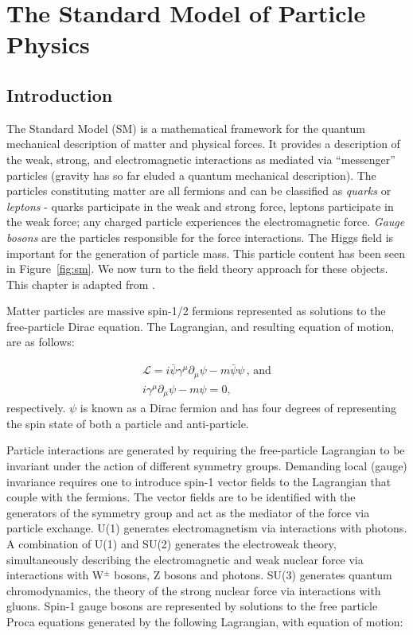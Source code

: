 \chapter{The Standard Model of Particle Physics}
\label{chap:sm}

\section{Introduction}

The Standard Model (SM) is a mathematical framework for the quantum mechanical description of matter and physical forces. It provides a description of the weak, strong, and electromagnetic interactions as mediated via ``messenger'' particles (gravity has so far eluded a quantum mechanical description). The particles constituting matter are all fermions and can be classified as \textit{quarks} or \textit{leptons} - quarks participate in the weak and strong force, leptons participate in the weak force; any charged particle experiences the electromagnetic force. \textit{Gauge bosons} are the particles responsible for the force interactions. The Higgs field is important for the generation of particle mass. This particle content has been seen in Figure~\ref{fig:sm}. We now turn to the field theory approach for these objects. This chapter is adapted from \cite{halzmar, thomson, griffiths}.

Matter particles are massive spin-1/2 fermions represented as solutions to the free-particle Dirac equation. The Lagrangian, and resulting equation of motion, are as follows:

\begin{equation}
\begin{array}{l}
\mathcal{L} = i\bar{\psi}\gamma^{\mu}\partial_{\mu}\psi - m\bar{\psi}\psi\,,\,\textrm{and}\\
i\gamma^{\mu}\partial_{\mu}\psi - m\psi = 0,
\end{array}
\end{equation}
respectively. $\psi$ is known as a Dirac fermion and has four degrees of representing the spin state of both a particle and anti-particle.

Particle interactions are generated by requiring the free-particle Lagrangian to be invariant under the action of different symmetry groups. Demanding local (gauge) invariance requires one to introduce spin-1 vector fields to the Lagrangian that couple with the fermions. The vector fields are to be identified with the generators of the symmetry group and act as the mediator of the force via particle exchange. U(1) generates electromagnetism via interactions with photons. A combination of U(1) and SU(2) generates the electroweak theory, simultaneously describing the electromagnetic and weak nuclear force via interactions with W$^{\pm}$ bosons, Z bosons and photons. SU(3) generates quantum chromodynamics, the theory of the strong nuclear force via interactions with gluons.  Spin-1 gauge bosons are represented by solutions to the free particle Proca equations generated by the following Lagrangian, with equation of motion:

